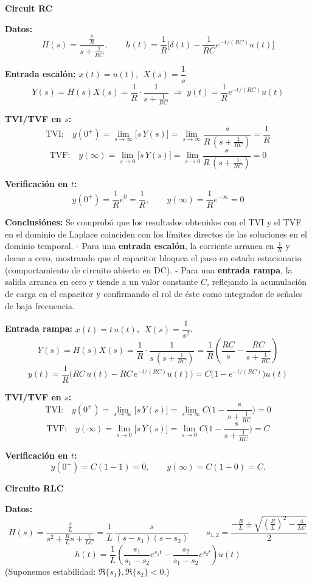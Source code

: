 \textbf{Circuit RC}

\textbf{Datos:}
\[
H(s)=\frac{\tfrac{s}{R}}{s+\tfrac{1}{RC}},\qquad
h(t)=\frac{1}{R}\Big[\delta(t)-\frac{1}{RC}e^{-t/(RC)}u(t)\Big]
\]

\textbf{Entrada escalón:} \(x(t)=u(t)\), \(\;X(s)=\dfrac{1}{s}\)
\[
Y(s)=H(s)X(s)=\frac{1}{R}\cdot\frac{1}{s+\tfrac{1}{RC}}
\;\Rightarrow\;
y(t)=\frac{1}{R}e^{-t/(RC)}u(t)
\]

\textbf{TVI/TVF en \(s\):}
\[
\text{TVI:}\quad y(0^+)=\lim_{s\to\infty}\big[s\,Y(s)\big]
=\lim_{s\to\infty}\frac{s}{R\,(s+\tfrac{1}{RC})}=\frac{1}{R}
\]
\[
\text{TVF:}\quad y(\infty)=\lim_{s\to 0}\big[s\,Y(s)\big]
=\lim_{s\to 0}\frac{s}{R\,(s+\tfrac{1}{RC})}=0
\]

\textbf{Verificación en \(t\):}
\[
y(0^+)=\frac{1}{R}e^{0}= \frac{1}{R},\qquad
y(\infty)=\frac{1}{R}e^{-\infty}=0
\]

\textbf{Conclusiónes:}  
Se comprobó que los resultados obtenidos con el TVI y el TVF en el dominio de Laplace coinciden con los límites directos de las soluciones en el dominio temporal.  
- Para una \textbf{entrada escalón}, la corriente arranca en $\tfrac{1}{R}$ y decae a cero, mostrando que el capacitor bloquea el paso en estado estacionario (comportamiento de circuito abierto en DC).  
- Para una \textbf{entrada rampa}, la salida arranca en cero y tiende a un valor constante $C$, reflejando la acumulación de carga en el capacitor y confirmando el rol de éste como integrador de señales de baja frecuencia.  

\medskip

\textbf{Entrada rampa:} \(x(t)=t\,u(t)\), \(\;X(s)=\dfrac{1}{s^2}\).
\[
Y(s)=H(s)X(s)=\frac{1}{R}\cdot\frac{1}{s\,(s+\tfrac{1}{RC})}
=\frac{1}{R}\!\left(\frac{RC}{s}-\frac{RC}{s+\tfrac{1}{RC}}\right)
\]
\[
y(t)=\frac{1}{R}\big(RC\,u(t)-RC\,e^{-t/(RC)}u(t)\big)
= C\big(1-e^{-t/(RC)}\big)u(t)
\]

\textbf{TVI/TVF en \(s\):}
\[
\text{TVI:}\quad y(0^+)=\lim_{s\to\infty}\big[s\,Y(s)\big]
=\lim_{s\to\infty} C\Big(1-\frac{s}{s+\tfrac{1}{RC}}\Big)=0
\]
\[
\text{TVF:}\quad y(\infty)=\lim_{s\to 0}\big[s\,Y(s)\big]
=\lim_{s\to 0} C\Big(1-\frac{s}{s+\tfrac{1}{RC}}\Big)=C
\]

\textbf{Verificación en \(t\):}
\[
y(0^+)=C(1-1)=0,\qquad y(\infty)=C(1-0)=C.
\]


\textbf{Circuito RLC}

\textbf{Datos:}
\[
H(s)=\frac{\tfrac{s}{L}}{s^2+\tfrac{R}{L}s+\tfrac{1}{LC}}
=\frac{1}{L}\,\frac{s}{(s-s_1)(s-s_2)}\qquad
s_{1,2}=\frac{-\tfrac{R}{L}\pm\sqrt{\left(\tfrac{R}{L}\right)^2-\tfrac{4}{LC}}}{2}
\]
\[
h(t)=\frac{1}{L}\left(\frac{s_1}{s_1-s_2}e^{s_1 t}
-\frac{s_2}{s_1-s_2}e^{s_2 t}\right)u(t)
\]
(Suponemos estabilidad: \(\Re\{s_1\},\Re\{s_2\}<0\).)


